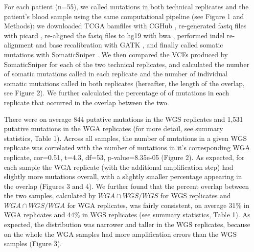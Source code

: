 \documentclass[11pt]{article} %
\begin{document}
For each patient (n=55), we called mutations in both technical replicates and the patient's blood sample using the same computational pipeline (see Figure 1 and Methods): we downloaded TCGA bamfiles with CGHub \citep{CGHub}, re-generated fastq files with picard \citep{picard}, re-aligned the fastq files to hg19 with bwa \citep{bwa}, performed indel re-alignment and base recalibration with GATK \citep{GATK}, and finally called somatic mutations with SomaticSniper \citep{SomaticSniper}. We then compared the VCFs produced by SomaticSniper for each of the two technical replicates, and calculated the number of somatic mutations called in each replicate and the number of individual somatic mutations called in both replicates (hereafter, the length of the overlap, see Figure 2). We further calculated the percentage of of mutations in each replicate that occurred in the overlap between the two. 

There were on average 844 putative mutations in the WGS replicates and 1,531 putative mutations in the WGA replicates (for more detail, see summary statistics, Table 1). Across all samples, the number of mutations in a given WGS replicate was correlated with the number of mutations in it's corresponding WGA replicate, cor=0.51, t=4.3, df=53, p-value=8.35e-05 (Figure 2). As expected, for each sample the WGA replicate (with the additional amplification step) had slightly more mutations overall, with a slightly smaller percentage appearing in the overlap (Figures 3 and 4). We further found that the percent overlap between the two samples, calculated by $WGA \cap WGS/WGS$ for WGS replicates and $WGA \cap WGS/WGA$ for WGA replicates, was fairly consistent, on average 31\% in WGA replicates and 44\% in WGS replicates (see summary statistics, Table 1). As expected, the distribution was narrower and taller in the WGS replicates, because on the whole the WGA samples had more amplification errors than the WGS samples (Figure 3).
\end{document}
